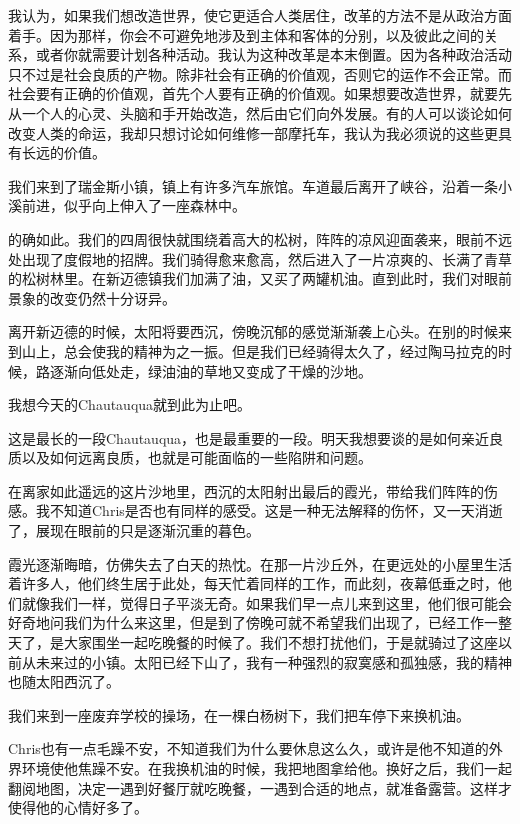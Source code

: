 \documentclass[UTF8]{article}
\begin{document}
\par 我认为，如果我们想改造世界，使它更适合人类居住，改革的方法不是从政治方面着手。因为那样，你会不可避免地涉及到主体和客体的分别，以及彼此之间的关系，或者你就需要计划各种活动。我认为这种改革是本末倒置。因为各种政治活动只不过是社会良质的产物。除非社会有正确的价值观，否则它的运作不会正常。而社会要有正确的价值观，首先个人要有正确的价值观。如果想要改造世界，就要先从一个人的心灵、头脑和手开始改造，然后由它们向外发展。有的人可以谈论如何改变人类的命运，我却只想讨论如何维修一部摩托车，我认为我必须说的这些更具有长远的价值。
\par 我们来到了瑞金斯小镇，镇上有许多汽车旅馆。车道最后离开了峡谷，沿着一条小溪前进，似乎向上伸入了一座森林中。
\par 的确如此。我们的四周很快就围绕着高大的松树，阵阵的凉风迎面袭来，眼前不远处出现了度假地的招牌。我们骑得愈来愈高，然后进入了一片凉爽的、长满了青草的松树林里。在新迈德镇我们加满了油，又买了两罐机油。直到此时，我们对眼前景象的改变仍然十分讶异。
\par 离开新迈德的时候，太阳将要西沉，傍晚沉郁的感觉渐渐袭上心头。在别的时候来到山上，总会使我的精神为之一振。但是我们已经骑得太久了，经过陶马拉克的时候，路逐渐向低处走，绿油油的草地又变成了干燥的沙地。
\par 我想今天的Chautauqua就到此为止吧。
\par 这是最长的一段Chautauqua，也是最重要的一段。明天我想要谈的是如何亲近良质以及如何远离良质，也就是可能面临的一些陷阱和问题。
\par 在离家如此遥远的这片沙地里，西沉的太阳射出最后的霞光，带给我们阵阵的伤感。我不知道Chris是否也有同样的感受。这是一种无法解释的伤怀，又一天消逝了，展现在眼前的只是逐渐沉重的暮色。
\par 霞光逐渐晦暗，仿佛失去了白天的热忱。在那一片沙丘外，在更远处的小屋里生活着许多人，他们终生居于此处，每天忙着同样的工作，而此刻，夜幕低垂之时，他们就像我们一样，觉得日子平淡无奇。如果我们早一点儿来到这里，他们很可能会好奇地问我们为什么来这里，但是到了傍晚可就不希望我们出现了，已经工作一整天了，是大家围坐一起吃晚餐的时候了。我们不想打扰他们，于是就骑过了这座以前从未来过的小镇。太阳已经下山了，我有一种强烈的寂寞感和孤独感，我的精神也随太阳西沉了。
\par 我们来到一座废弃学校的操场，在一棵白杨树下，我们把车停下来换机油。
\par Chris也有一点毛躁不安，不知道我们为什么要休息这么久，或许是他不知道的外界环境使他焦躁不安。在我换机油的时候，我把地图拿给他。换好之后，我们一起翻阅地图，决定一遇到好餐厅就吃晚餐，一遇到合适的地点，就准备露营。这样才使得他的心情好多了。
\end{document}
